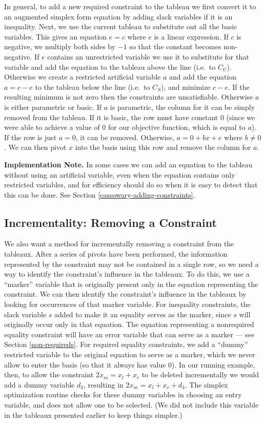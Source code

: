 \documentclass{article}
\begin{document}
In general, to add a new required constraint to the tableau we first
convert it to an augmented simplex form equation by adding slack variables
if it is an inequality.  Next, we use the current tableau to substitute out
all the basic variables.  This gives an equation $e = c$ where $e$ is a
linear expression.  If $c$ is negative, we multiply both sides by $-1$ so
that the constant becomes non-negative.  If $e$ contains an unrestricted
variable we use it to substitute for that variable and add the equation to
the tableau above the line (i.e.\ to $C_U$).  Otherwise we create a
restricted artificial variable $a$ and add the equation $a = c - e$ to the
tableau below the line (i.e.\ to $C_S$), and minimize $c - e$. If the
resulting minimum is not zero then the constraints are unsatisfiable.
Otherwise $a$ is either parametric or basic.  If $a$ is parametric, the
column for it can be simply removed from the tableau.  If it is basic, the
row must have constant 0 (since we were able to achieve a value of 0 for
our objective function, which is equal to $a$).  If the row is just $a =
0$, it can be removed.  Otherwise, $a = 0 + b x + e$ where $b \neq 0$.  We
can then pivot $x$ into the basis using this row and remove the column for
$a$.

{\bf Implementation Note.}  In some cases we can add an equation to the
tableau without using an artificial variable, even when the equation
contains only restricted variables, and for efficiency should do so when
it is easy to detect that this can be done.  See Section
\ref{cassowary-adding-constraints}.

\subsection{Incrementality: Removing a Constraint}
\label{removing-constraints}

We also want a method for incrementally removing a constraint from the
tableaux.  After a series of pivots have been performed, the information
represented by the constraint may not be contained in a single row, so we
need a way to identify the constraint's influence in the tableaux.  To do
this, we use a ``marker'' variable that is originally present only in the
equation representing the constraint.  We can then identify the
constraint's influence in the tableaux by looking for occurrences of that
marker variable.  For inequality constraints, the slack variable $s$ added
to make it an equality serves as the marker, since $s$ will originally
occur only in that equation.  The equation representing a nonrequired
equality constraint will have an error variable that can serve as a marker
--- see Section \ref{non-requireds}.  For required equality constraints, we
add a ``dummy'' restricted variable to the original equation to serve as a
marker, which we never allow to enter the basis (so that it always has
value 0).  In our running example, then, to allow the constraint $2 x_m =
x_l + x_r$ to be deleted incrementally we would add a dummy variable $d_3$,
resulting in $2 x_m = x_l + x_r + d_3$.  The simplex optimization routine
checks for these dummy variables in choosing an entry variable, and does
not allow one to be selected.  (We did not include this variable in the
tableaux presented earlier to keep things simpler.)
\end{document}
